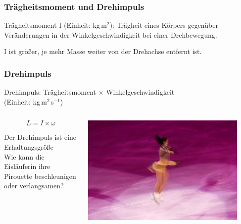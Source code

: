 \documentclass{beamer}
\begin{document}

\begin{frame}
\frametitle{Trägheitsmoment und Drehimpuls}


Trägheitsmoment I (Einheit:  kg\(\,\)m$^2$): Trägheit eines Körpers gegenüber Veränderungen in der Winkelgeschwindigkeit bei einer Drehbewegung. 

I ist größer, je mehr Masse weiter von der Drehachse entfernt ist. 




\end{frame}


\begin{frame}
\frametitle{Drehimpuls}

Drehimpuls: Trägheitsmoment \(\times\) Winkelgeschwindigkeit \\ (Einheit: kg\(\,\)m$^2\,$s$^{-1}$)



\begin{columns}[c]

\begin{column}{5cm}



\[
L = I\times \omega
\]


Der Drehimpuls ist eine Erhaltungsgröße \\[0.2 cm]


Wie kann die Eisläuferin ihre Pirouette beschleunigen oder verlangsamen?


\end{column}

\begin{column}{5cm}


\begin{center}
\includegraphics[width=0.9\textwidth]{figureskater.jpg}
\end{center}

\end{column}


\end{columns}


\end{frame}
\end{document}
